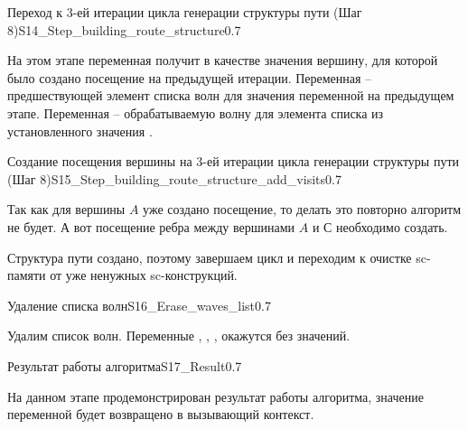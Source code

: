 \begin{algostep}{Переход к 3-ей итерации цикла генерации структуры пути
    (Шаг 8)}{S14_Step_building_route_structure}{0.7}
 
  На этом этапе переменная  получит в качестве
  значения вершину, для которой было создано посещение на предыдущей
  итерации. Переменная  – предшествующей элемент
  списка волн для значения переменной  на предыдущем
  этапе. Переменная  – обрабатываемую волну для
  элемента списка из установленного значения .
\end{algostep}


\begin{algostep}{Создание посещения вершины на 3-ей итерации цикла
    генерации структуры пути (Шаг
    8)}{S15_Step_building_route_structure_add_visits}{0.7}
 
  Так как для вершины $A$ уже создано посещение, то делать это
  повторно алгоритм не будет. А вот посещение ребра между вершинами
  $A$ и $С$ необходимо создать.

  Структура пути создано, поэтому завершаем цикл и переходим к очистке
  sc-памяти от уже ненужных sc-конструкций.
\end{algostep}

\begin{algostep}{Удаление списка волн}{S16_Erase_waves_list}{0.7}
 
  Удалим список волн. Переменные ,
  , ,
   окажутся без значений.
\end{algostep}


\begin{algostep}{Результат работы алгоритма}{S17_Result}{0.7}
 
  На данном этапе продемонстрирован результат работы алгоритма,
  значение переменной  будет возвращено в вызывающий
  контекст.
\end{algostep}


